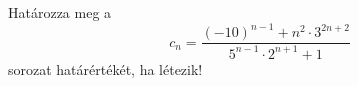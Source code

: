 \documentclass[11pt]{scrartcl}
\begin{document}
Határozza meg a
\[
	c_n = \frac{
		(-10)^{n - 1} + n^2 \cdot 3^{2n + 2}
	}{
		5^{n - 1} \cdot 2^{n + 1} + 1
	}
\]
sorozat határértékét, ha létezik!
\end{document}
